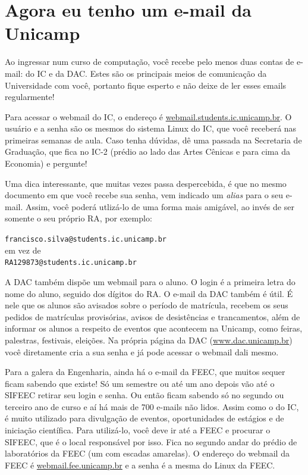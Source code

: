 
\section{Agora eu tenho um e-mail da Unicamp}

Ao ingressar num curso de computação, você recebe pelo menos duas contas de e-mail: do IC e da
DAC. Estes são os principais meios de comunicação da Universidade com você,
portanto fique esperto e não deixe de ler esses emails regularmente!

Para acessar o webmail do IC, o endereço é \url{webmail.students.ic.unicamp.br}.
O usuário e a senha são os mesmos do sistema Linux do IC, que você receberá nas
primeiras semanas de aula. Caso tenha dúvidas, dê uma passada na Secretaria de Graduação,
que fica no IC-2 (prédio ao lado das Artes Cênicas e para cima da Economia)
e pergunte!

Uma dica interessante, que muitas vezes passa
despercebida, é que no mesmo documento em que você recebe sua senha, vem indicado
um {\it alias} para o seu e-mail. Assim, você poderá utlizá-lo de
uma forma mais amigável, ao invés de ser somente o seu próprio RA, por 
exemplo:

\begin{center}
\texttt{francisco.silva@students.ic.unicamp.br}\\
em vez de\\ 
\texttt{RA129873@students.ic.unicamp.br}
\end{center}

A DAC também dispõe um webmail para o aluno. O login é a primeira letra do nome
do aluno, seguido dos dígitos do RA. O e-mail da DAC também é útil. É nele que os
alunos são avisados sobre o período de matrícula, recebem os seus pedidos de
matrículas provisórias, avisos de desistências e trancamentos, além de informar
os alunos a respeito de eventos que acontecem na Unicamp, como feiras,
palestras, festivais, eleições. Na própria página da DAC
(\url{www.dac.unicamp.br}) você diretamente cria a sua senha e já pode
acessar o webmail dali mesmo.

Para a galera da Engenharia, ainda há o e-mail da FEEC, que muitos sequer ficam
sabendo que existe! Só um semestre ou até um ano depois vão até o SIFEEC retirar
seu login e senha. Ou então ficam sabendo só no segundo ou terceiro ano de curso
e aí há mais de 700 e-mails não lidos. Assim como o do IC, é muito
utilizado para divulgação de eventos, oportunidades de estágios e de iniciação
científica. Para utilizá-lo, você deve ir até a FEEC e procurar o SIFEEC, que
é o local responsável por isso. Fica no segundo andar do prédio de laboratórios
da FEEC (um com escadas amarelas). O endereço do webmail da FEEC
é \url{webmail.fee.unicamp.br} e a senha é a mesma do Linux da FEEC.

